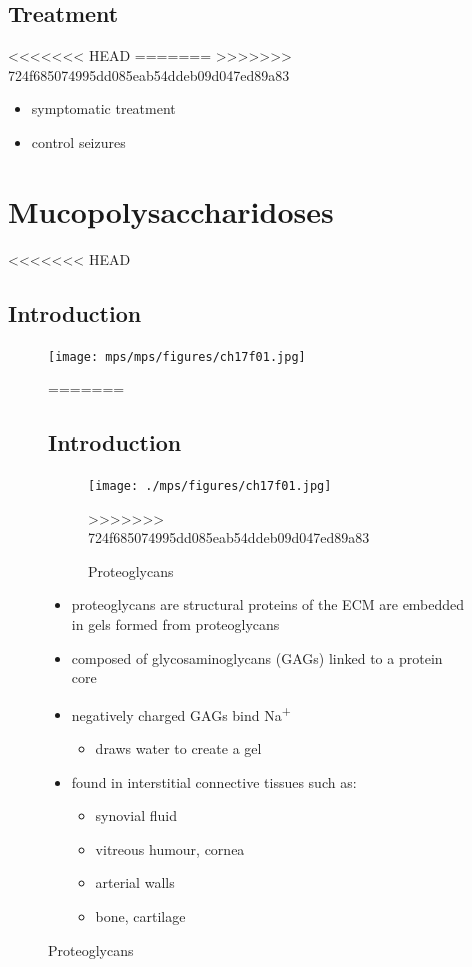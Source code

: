 \documentclass[fontsize=12pt]{scrartcl}
\begin{document}
\begin{enumerate}
\begin{enumerate}
\begin{enumerate}
\begin{enumerate}
\begin{table}[htbp]
\begin{enumerate}
\begin{enumerate}
\begin{enumerate}
\subsection{Treatment}
<<<<<<< HEAD
\label{sec:org9f20f82}
=======
\label{sec:org682f525}
>>>>>>> 724f685074995dd085eab54ddeb09d047ed89a83
\begin{itemize}
\item symptomatic treatment
\item control seizures
\end{itemize}

\section{Mucopolysaccharidoses}
<<<<<<< HEAD
\label{sec:org6af0708}
\subsection{Introduction}
\label{sec:orgfef2ada}
\begin{figure}[htbp]
\centering
\texttt{[image: mps/mps/figures/ch17f01.jpg]}
\caption[Proteoglycans]{\label{fig:orgef794f5}Proteoglycans}
=======
\label{sec:org2abad88}
\subsection{Introduction}
\label{sec:orgeaa75cc}
\begin{figure}[htbp]
\centering
\texttt{[image: ./mps/figures/ch17f01.jpg]}
\caption[Proteoglycans]{\label{fig:org4200080}
Proteoglycans}
>>>>>>> 724f685074995dd085eab54ddeb09d047ed89a83
\end{figure}

\begin{itemize}
\item proteoglycans are structural proteins of the ECM are embedded in gels formed from
proteoglycans
\item composed of glycosaminoglycans (GAGs) linked to a protein core
\item negatively charged GAGs bind Na\textsuperscript{+}
\begin{itemize}
\item draws water to create a gel
\end{itemize}
\item found in interstitial connective tissues such as: 
\begin{itemize}
\item synovial fluid
\item vitreous humour, cornea
\item arterial walls
\item bone, cartilage
\end{itemize}
\end{itemize}


\end{figure}
\end{enumerate}
\end{enumerate}
\end{enumerate}
\end{table}
\end{enumerate}
\end{enumerate}
\end{enumerate}
\end{enumerate}
\end{document}

